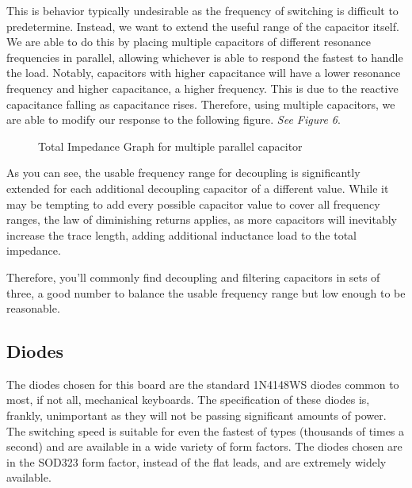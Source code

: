 \documentclass[11pt]{article}
\begin{document}
This is behavior typically undesirable as the frequency of switching is difficult to predetermine. Instead, we want to extend the useful range of the capacitor itself. We are able to do this by placing multiple capacitors of different resonance frequencies in parallel, allowing whichever is able to respond the fastest to handle the load. Notably, capacitors with higher capacitance will have a lower resonance frequency and higher capacitance, a higher frequency. This is due to the reactive capacitance falling as capacitance rises. Therefore, using multiple capacitors, we are able to modify our response to the following figure. \emph{See Figure 6}.

\begin{figure}[h!]
  \begin{center}
    \caption{Total Impedance Graph for multiple parallel capacitor}
  \end{center}
\end{figure}

As you can see, the usable frequency range for decoupling is significantly extended for each additional decoupling capacitor of a different value. While it may be tempting to add every possible capacitor value to cover all frequency ranges, the law of diminishing returns applies, as more capacitors will inevitably increase the trace length, adding additional inductance load to the total impedance.

Therefore, you'll commonly find decoupling and filtering capacitors in sets of three, a good number to balance the usable frequency range but low enough to be reasonable. 

\subsection{Diodes}

The diodes chosen for this board are the standard 1N4148WS diodes common to most, if not all, mechanical keyboards. The specification of these diodes is, frankly, unimportant as they will not be passing significant amounts of power. The switching speed is suitable for even the fastest of types (thousands of times a second) and are available in a wide variety of form factors. The diodes chosen are in the SOD323 form factor, instead of the flat leads,\footnotemark {} and are extremely widely available.
\end{document}
